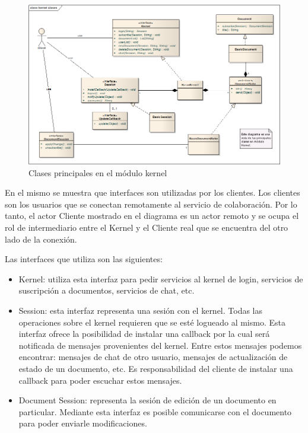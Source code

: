 \documentclass[12pt,a4paper]{article}
\begin{document}
	\begin{figure}[!ht]
		\begin{center}
			\includegraphics[width=14cm]{kernel-clases.png}
			\caption{\label{clases-kernel} Clases principales en el módulo kernel }
		\end{center}
	\end{figure}

En el mismo se muestra que interfaces son utilizadas por los clientes. Los clientes son los usuarios que se conectan
remotamente al servicio de colaboración. Por lo tanto, el actor Cliente mostrado en el diagrama es un actor remoto y se
ocupa el rol de intermediario entre el Kernel y el Cliente real que se encuentra del otro lado de la conexión.

Las interfaces que utiliza son las siguientes:
\begin{itemize}
	\item Kernel: utiliza esta interfaz para pedir servicios al kernel de login, servicios de suscripción a documentos,
	servicios de chat, etc.

	\item Session: esta interfaz representa una sesión con el kernel. Todas las operaciones sobre el kernel requieren que se
	esté logueado al mismo. Esta interfaz ofrece la posibilidad de instalar una callback por la cual será notificada de mensajes
	provenientes del kernel. Entre estos mensajes podemos encontrar: mensajes de chat de otro usuario, mensajes de actualización
	de estado de un documento, etc. Es responsabilidad del cliente de instalar una callback para poder escuchar estos mensajes.

	\item Document Session: representa la sesión de edición de un documento en particular. Mediante esta interfaz es posible
	comunicarse con el documento para poder enviarle modificaciones.
\end{itemize}
\end{document}
